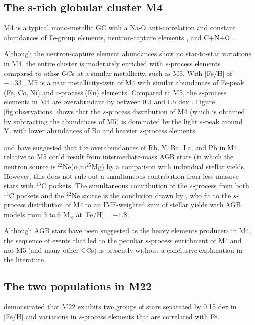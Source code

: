 \subsection{The s-rich globular cluster M4}
M4 is a typical mono-metallic GC with a Na-O anti-correlation and constant abundances of Fe-group elements, neutron-capture elements \citep[except possibly Y, see][]{Villanova:2011fo}, and C+N+O \citep{Drake:1992kw,DOrazi:2010kb,Marino:2008du,Marino:2011hu}.

Although the neutron-capture element abundances show no star-to-star variations in M4, the entire cluster is moderately enriched with $s$-process elements compared to other GCs at a similar metallicity, such as M5. With [Fe/H] of $-1.33$ \citep{Carretta:2009di}, M5 is a near metallicity-twin of M4 with similar abundances of Fe-peak (Fe, Co, Ni) and $r$-process (Eu) elements. Compared to M5, the $s$-process elements in M4 are overabundant by between 0.3 and 0.5 dex \citep{Ivans:2001ju,Yong:2008in,Yong:2008ib}. Figure \ref{fig:observations} shows that the $s$-process distribution of M4 (which is obtained by subtracting the abundances of M5) is dominated by the light $s$-peak around Y, with lower abundances of Ba and heavier $s$-process elements.

\citet{Karakas:2010wy} and \citet{Roederer:2011hw} have suggested that the overabundances of Rb, Y, Ba, La, and Pb in M4 relative to M5 could result from intermediate-mass AGB stars (in which the neutron source is $^{22}$Ne($\alpha$,n)$^{25}$Mg) by a comparison with individual stellar yields. However, this does not rule out a simultaneous contribution from less massive stars with $^{13}$C pockets. The simultaneous contribution of the $s$-process from both $^{13}$C pockets and the $^{22}$Ne source is the conclusion drawn by \citet{Straniero:2014jk}, who fit to the $s$-process distribution of M4 to an IMF-weighted sum of stellar yields with AGB models from 3 to 6 M$_\odot$ at [Fe/H]$=-1.8$.

Although AGB stars have been suggested as the heavy elements producers in M4, the sequence of events that led to the peculiar $s$-process enrichment of M4 and not M5 (and many other GCs) is presently without a conclusive explanation in the literature.

\subsection{The two populations in M22}

\citet{Marino:2009je} demonstrated that M22 exhibits two groups of stars separated by 0.15 dex in [Fe/H] and variations in $s$-process elements that are correlated with Fe. 

